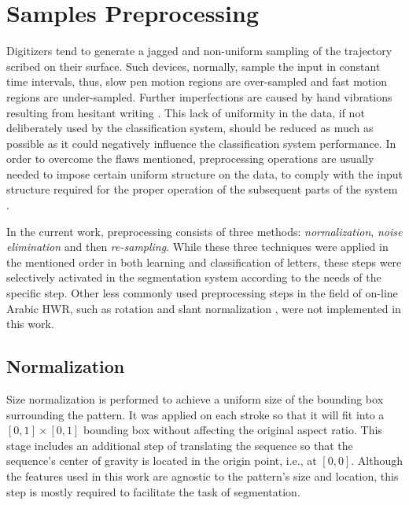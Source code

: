 \newpage{}

\section{Samples Preprocessing}
\label{sec:preprocessing}

\iftoggle{edit-mode}{\hspace{0pt}\marginpar{Introduction}}{}
Digitizers tend to generate a jagged and non-uniform sampling of the trajectory scribed on their surface.
Such devices, normally, sample the input in constant time intervals, thus, slow pen motion regions are over-sampled and fast motion regions are under-sampled.
Further imperfections are caused by hand vibrations resulting from hesitant writing \cite{huang2009preprocessing}.
This lack of uniformity in the data, if not deliberately used by the classification system, should be reduced as much as possible as it could negatively influence the classification system performance.
In order to overcome the flaws mentioned, preprocessing operations are usually needed to impose certain uniform structure on the data, to comply with the input structure required for the proper operation of the subsequent parts of the system \cite{al2011online}.

\iftoggle{edit-mode}{\hspace{0pt}\marginpar{Preprocessing steps usage}}{}
In the current work, preprocessing consists of three methods: \emph{normalization}, \emph{noise elimination} and then \emph{re-sampling}.
While these three techniques were applied in the mentioned order in both learning and classification of letters, these steps were selectively activated in the segmentation system according to the needs of the specific step.
Other less commonly used preprocessing steps in the field of on-line Arabic HWR, such as rotation and slant normalization \cite{jaeger2001online}, were not implemented in this work. 


\subsection{Normalization}
\iftoggle{edit-mode}{\hspace{0pt}\marginpar{Goal}}{}
Size normalization is performed to achieve a uniform size of the bounding box surrounding the pattern. 
It was applied on each stroke so that it will fit into a $[0,1]\times[0,1]$ bounding box without affecting the original aspect ratio. 
This stage includes an additional step of translating the sequence so that the sequence's center of gravity is located in the origin point, i.e., at $[0,0]$.
Although the features used in this work are agnostic to the pattern's size and location, this step is mostly required to facilitate the task of segmentation.

